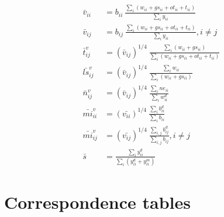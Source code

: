 \documentclass[12pt,english]{article}
\begin{document}
\begin{align*}
\bar{v}_{ii} &= b_{ii} \  \frac{\sum_i (w_{ii} + gs_{ii} + ot_{ii} + t_{ii})}{\sum_i y_{ii}}\\
\bar{v}_{ij} &= b_{ij} \ \frac{\sum_i (w_{ii} + gs_{ii} + ot_{ii} + t_{ii})}{\sum_i y_{ii}}, i\neq j \\
\bar{t}^v_{ij} &= (\bar{v}_{ij})^{1/4} \ \frac{\sum_i (w_{ii} + gs_{ii})}{\sum_i (w_{ii} + gs_{ii} + ot_{ii} + t_{ii})} \\ 
\bar{ls}^v_{ij} &=  (\bar{v}_{ij})^{1/4} \ \frac{\sum_i w_{ii}}{\sum_i (w_{ii} + gs_{ii})} \\ 
\bar{n}^v_{ij} &=  (\bar{v}_{ij})^{1/4} \ \frac{\sum_i ne_{ii}}{\sum_i w^d_{ii}} \\ 
\bar{mi}^v_{ii} &= (\bar{v_{ii}})^{1/4} \  \frac{\sum_i b^d_{ii}}{\sum_i b_{ii}} \\ 
\bar{mi}^v_{ij} &= (\bar{v_{ij}})^{1/4} \ \frac{\sum_{i,j} b^d_{ij}}{\sum_{i,j} b_{ij}}, i\neq j \\ 
\bar{s} &= \frac{\sum_i y^d_{ii}}{\sum_i (y^d_{ii} + y^m_{ii})}
\end{align*}



\section{Correspondence tables}
\end{document}
